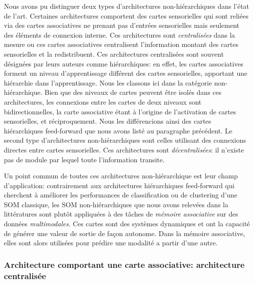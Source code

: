 \documentclass[../main]{subfiles}
\begin{document}
Nous avons pu distinguer deux types d'architectures non-hiérarchiques dans l'état de l'art.
Certaines architectures comportent des cartes sensorielles qui sont reliées via des cartes associatives ne prenant pas d'entrées sensorielles mais seulement des éléments de connexion interne. Ces architectures sont \emph{centralisées} dans la mesure ou ces cartes associatives centralisent l'information  montant des cartes sensorielles et la redistribuent. Ces architectures centralisées sont souvent désignées par leurs auteurs comme hiérarchiques: en effet, les cartes associatives forment un niveau d'apprentissage différent des cartes sensorielles, apportant une hiérarchie dans l'apprentissage. Nous les classons ici dans la catégorie non-hiérarchique. Bien que des niveaux de cartes peuvent être isolés dans ces architectures, les connexions entre les cartes de deux niveaux sont bidirectionnelles, la carte associative étant à l'origine de l'activation de cartes sensorielles, et réciproquement.
Nous les différencions ainsi des cartes hiérarchiques feed-forward que nous avons listé au paragraphe précédent.
Le second type d'architectures non-hiérarchiques sont celles utilisant des connexions directes entre cartes sensorielles. Ces architectures sont \emph{décentralisées}: il n'existe pas de module par lequel toute l'information transite.

Un point commun de toutes ces architectures non-hiérarchique est leur champ d'application: contrairement aux architectures hiérarchiques feed-forward qui cherchent à améliorer les performances de classification ou de clustering d'une SOM classique, les SOM non-hiérarchiques que nous avons relevées dans la littératures sont plutôt appliquées à des tâches de \emph{mémoire associative} sur des données \emph{multimodales}. Ces cartes sont des systèmes dynamiques et ont la capacité de générer une valeur de sortie de façon autonome. Dans la mémoire associative, elles sont alors utilisées pour prédire une modalité a partir d'une autre.

\subsubsection{Architecture comportant une carte associative: architecture centralisée}
\end{document}
